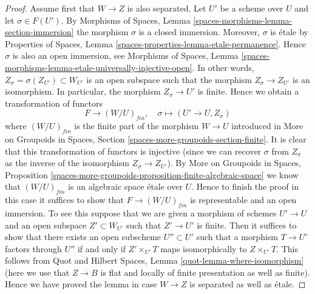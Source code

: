 \begin{proof}
Assume first that $W \to Z$ is also separated.
Let $U'$ be a scheme over $U$ and let $\sigma \in F(U')$. By
Morphisms of Spaces, Lemma \ref{spaces-morphisms-lemma-section-immersion}
the morphism $\sigma$ is a closed immersion.
Moreover, $\sigma$ is \'etale by
Properties of Spaces, Lemma \ref{spaces-properties-lemma-etale-permanence}.
Hence $\sigma$ is also an open immersion, see
Morphisms of Spaces,
Lemma \ref{spaces-morphisms-lemma-etale-universally-injective-open}.
In other words, $Z_\sigma = \sigma(Z_{U'}) \subset W_{U'}$ is
an open subspace such that the morphism $Z_\sigma \to Z_{U'}$
is an isomorphism. In particular, the morphism $Z_\sigma \to U'$
is finite. Hence we obtain a transformation of functors
$$
F \longrightarrow (W/U)_{fin},\quad
\sigma \longmapsto (U' \to U, Z_\sigma)
$$
where $(W/U)_{fin}$ is the finite part of the morphism $W \to U$
introduced in
More on Groupoids in Spaces, Section
\ref{spaces-more-groupoids-section-finite}.
It is clear that this transformation of functors is injective (since we can
recover $\sigma$ from $Z_\sigma$ as the inverse of the isomorphism
$Z_\sigma \to Z_{U'}$). By
More on Groupoids in Spaces, Proposition
\ref{spaces-more-groupoids-proposition-finite-algebraic-space}
we know that $(W/U)_{fin}$ is an algebraic space \'etale over $U$.
Hence to finish the proof in this case it suffices to show that
$F \to (W/U)_{fin}$ is representable and an open immersion.
To see this suppose that we are given a morphism of schemes $U' \to U$
and an open subspace $Z' \subset W_{U'}$ such that $Z' \to U'$
is finite. Then it suffices to show that there exists an
open subscheme $U'' \subset U'$ such that a morphism
$T \to U'$ factors through $U''$ if and only if $Z' \times_{U'} T$
maps isomorphically to $Z \times_{U'} T$. This follows from
Quot and Hilbert Spaces, Lemma \ref{quot-lemma-where-isomorphism}
(here we use that $Z \to B$ is flat and locally of finite presentation
as well as finite).
Hence we have proved the lemma in case $W \to Z$ is separated
as well as \'etale.


\end{proof}
